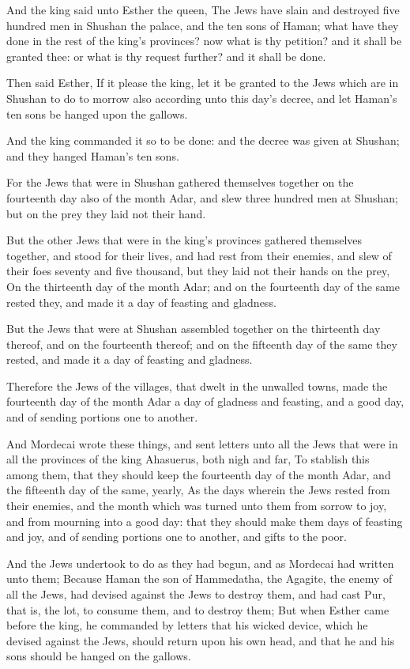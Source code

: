 \verse And the king said unto Esther the queen, The Jews have slain and destroyed five hundred men in Shushan the palace, and the ten sons of Haman; what have they done in the rest of the king's provinces? now what is thy petition? and it shall be granted thee: or what is thy request further? and it shall be done.

\verse Then said Esther, If it please the king, let it be granted to the Jews which are in Shushan to do to morrow also according unto this day's decree, and let Haman's ten sons be hanged upon the gallows.

\verse And the king commanded it so to be done: and the decree was given at Shushan; and they hanged Haman's ten sons.

\verse For the Jews that were in Shushan gathered themselves together on the fourteenth day also of the month Adar, and slew three hundred men at Shushan; but on the prey they laid not their hand.

\verse But the other Jews that were in the king's provinces gathered themselves together, and stood for their lives, and had rest from their enemies, and slew of their foes seventy and five thousand, but they laid not their hands on the prey, \verse On the thirteenth day of the month Adar; and on the fourteenth day of the same rested they, and made it a day of feasting and gladness.

\verse But the Jews that were at Shushan assembled together on the thirteenth day thereof, and on the fourteenth thereof; and on the fifteenth day of the same they rested, and made it a day of feasting and gladness.

\verse Therefore the Jews of the villages, that dwelt in the unwalled towns, made the fourteenth day of the month Adar a day of gladness and feasting, and a good day, and of sending portions one to another.

\verse And Mordecai wrote these things, and sent letters unto all the Jews that were in all the provinces of the king Ahasuerus, both nigh and far, \verse To stablish this among them, that they should keep the fourteenth day of the month Adar, and the fifteenth day of the same, yearly, \verse As the days wherein the Jews rested from their enemies, and the month which was turned unto them from sorrow to joy, and from mourning into a good day: that they should make them days of feasting and joy, and of sending portions one to another, and gifts to the poor.

\verse And the Jews undertook to do as they had begun, and as Mordecai had written unto them; \verse Because Haman the son of Hammedatha, the Agagite, the enemy of all the Jews, had devised against the Jews to destroy them, and had cast Pur, that is, the lot, to consume them, and to destroy them; \verse But when Esther came before the king, he commanded by letters that his wicked device, which he devised against the Jews, should return upon his own head, and that he and his sons should be hanged on the gallows.

